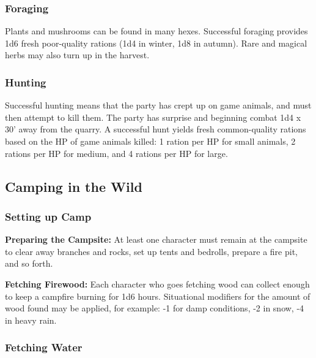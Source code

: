 \documentclass{book}
\begin{document}
\paragraph{}

\subsubsection*{Foraging}\label{foraging}

Plants and mushrooms can be found in many hexes. Successful foraging
provides 1d6 fresh poor-quality rations (1d4 in winter, 1d8 in autumn).
Rare and magical herbs may also turn up in the harvest.

\subsubsection*{Hunting}\label{hunting}

Successful hunting means that the party has crept up on game animals,
and must then attempt to kill them. The party has surprise and beginning
combat 1d4 x 30' away from the quarry. A successful hunt yields fresh
common-quality rations based on the HP of game animals killed: 1 ration
per HP for small animals, 2 rations per HP for medium, and 4 rations per
HP for large.

\newpage

\subsection*{Camping in the Wild}\label{camping-in-the-wild}

\subsubsection*{Setting up Camp}\label{setting-up-camp}

\textbf{Preparing the Campsite:} At least one character must remain at
the campsite to clear away branches and rocks, set up tents and
bedrolls, prepare a fire pit, and so forth.

\textbf{Fetching Firewood:} Each character who goes fetching wood can
collect enough to keep a campfire burning for 1d6 hours. Situational
modifiers for the amount of wood found may be applied, for example: -1
for damp conditions, -2 in snow, -4 in heavy rain.

\subsubsection*{Fetching Water}\label{fetching-water}
\end{document}
